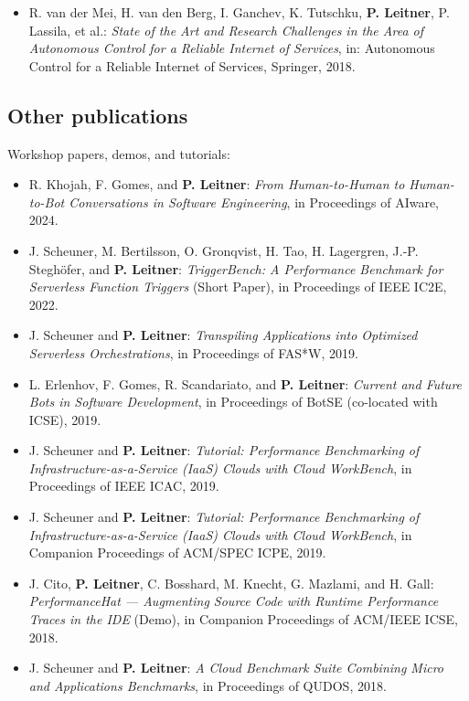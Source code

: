 \documentclass[a4paper,11pt]{article}
\begin{document}
\begin{itemize}[itemsep=0.2em]
\item R. van der Mei, H. van den Berg, I. Ganchev, K. Tutschku, \textbf{P. Leitner}, P. Lassila, et al.: \emph{State of the Art and Research Challenges in the Area of Autonomous Control for a Reliable Internet of Services}, in: Autonomous Control for a Reliable Internet of Services, Springer, 2018.
\end{itemize}

\subsection{Other publications}

Workshop papers, demos, and tutorials:
\begin{itemize}[itemsep=0.2em]
\item R. Khojah, F. Gomes, and \textbf{P. Leitner}: \emph{From Human-to-Human to Human-to-Bot Conversations in Software Engineering}, in Proceedings of AIware, 2024.
\item J. Scheuner, M. Bertilsson, O. Gronqvist, H. Tao, H. Lagergren, J.-P. Stegh\"{o}fer, and \textbf{P. Leitner}: \emph{TriggerBench: A Performance Benchmark for Serverless Function Triggers} (Short Paper), in Proceedings of IEEE IC2E, 2022.
\item J. Scheuner and \textbf{P. Leitner}: \emph{Transpiling Applications into Optimized Serverless Orchestrations}, in Proceedings of FAS*W, 2019.
\item L. Erlenhov, F. Gomes, R. Scandariato, and \textbf{P. Leitner}: \emph{Current and Future Bots in Software Development}, in Proceedings of BotSE (co-located with ICSE), 2019.
\item J. Scheuner and \textbf{P. Leitner}: \emph{Tutorial: Performance Benchmarking of Infrastructure-as-a-Service (IaaS) Clouds with Cloud WorkBench}, in Proceedings of IEEE ICAC, 2019.
\item J. Scheuner and \textbf{P. Leitner}: \emph{Tutorial: Performance Benchmarking of Infrastructure-as-a-Service (IaaS) Clouds with Cloud WorkBench}, in Companion Proceedings of ACM/SPEC ICPE, 2019.
\item J. Cito, \textbf{P. Leitner}, C. Bosshard, M. Knecht, G. Mazlami, and H. Gall: \emph{PerformanceHat --- Augmenting Source Code with Runtime Performance Traces in the IDE} (Demo), in Companion Proceedings of ACM/IEEE ICSE, 2018.
\item J. Scheuner and \textbf{P. Leitner}: \emph{A Cloud Benchmark Suite Combining Micro and Applications Benchmarks}, in Proceedings of QUDOS, 2018.
\end{itemize}
\end{document}
